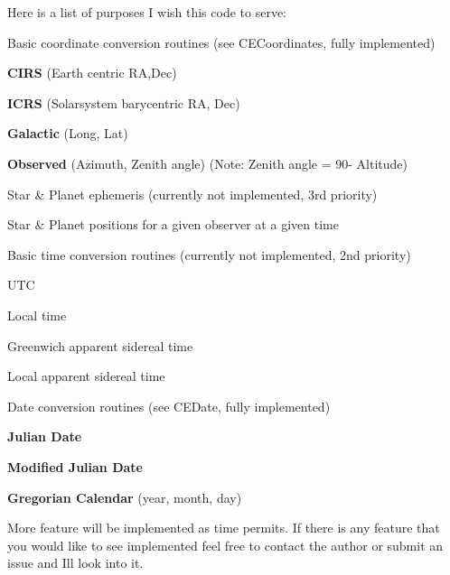 Here is a list of purposes I wish this code to serve\+:
\begin{DoxyItemize}
\item Basic coordinate conversion routines (see C\+E\+Coordinates, fully implemented)
\begin{DoxyItemize}
\item {\bfseries C\+I\+R\+S} (Earth centric R\+A,Dec)
\item {\bfseries I\+C\+R\+S} (Solarsystem barycentric R\+A, Dec)
\item {\bfseries Galactic} (Long, Lat)
\item {\bfseries Observed} (Azimuth, Zenith angle) (Note\+: Zenith angle = 90\textdegree -\/ Altitude)
\end{DoxyItemize}
\item Star \& Planet ephemeris (currently not implemented, 3rd priority)
\begin{DoxyItemize}
\item Star \& Planet positions for a given observer at a given time
\end{DoxyItemize}
\item Basic time conversion routines (currently not implemented, 2nd priority)
\begin{DoxyItemize}
\item U\+T\+C
\item Local time
\item Greenwich apparent sidereal time
\item Local apparent sidereal time
\end{DoxyItemize}
\item Date conversion routines (see C\+E\+Date, fully implemented)
\begin{DoxyItemize}
\item {\bfseries Julian Date}
\item {\bfseries Modified Julian Date}
\item {\bfseries Gregorian Calendar} (year, month, day)
\end{DoxyItemize}
\end{DoxyItemize}

More feature will be implemented as time permits. If there is any feature that you would like to see implemented feel free to contact the author or submit an issue and I\textquotesingle{}ll look into it.

